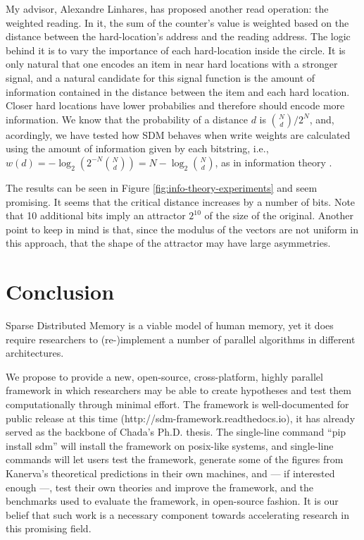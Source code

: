 My advisor, Alexandre Linhares, has proposed another read operation: the weighted reading. In it, the sum of the counter's value is weighted based on the distance between the hard-location's address and the reading address. The logic behind it is to vary the importance of each hard-location inside the circle.  It is only natural that one encodes an item in near hard locations with a stronger signal, and a natural candidate for this signal function is the amount of information contained in the distance between the item and each hard location.  Closer hard locations have lower probabilies and therefore should encode more information. We know that the probability of a distance $d$ is $\binom{N}{d}/2^N$, and, acordingly, we have tested how SDM behaves when write weights are calculated using the amount of information given by each bitstring, i.e., $w(d) = -\log_2 \left( 2^{-N} \binom{N}{d} \right) = N - \log_2 \binom{N}{d}$, as in information theory \citep{cover2012elements}.

The results can be seen in Figure \ref{fig:info-theory-experiments} and seem promising. It seems that the critical distance increases by a number of bits.  Note that 10 additional bits imply an attractor $2^{10}$ of the size of the original. Another point to keep in mind is that, since the modulus of the vectors are not uniform in this approach, that the shape of the attractor may have large asymmetries.


\chapter{Conclusion}

Sparse Distributed Memory is a viable model of human memory, yet it does require researchers to (re-)implement a number of parallel algorithms in different architectures.

We propose to provide a new, open-source, cross-platform, highly parallel framework in which researchers may be able to create hypotheses and test them computationally through minimal effort. The framework is well-documented for public release at this time (http://sdm-framework.readthedocs.io), it has already served as the backbone of Chada's Ph.D. thesis. The single-line command ``pip install sdm'' will install the framework on posix-like systems, and single-line commands will let users test the framework, generate some of the figures from Kanerva's theoretical predictions in their own machines, and --- if interested enough ---, test their own theories and improve the framework, and the benchmarks used to evaluate the framework, in open-source fashion. It is our belief that such work is a necessary component towards accelerating research in this promising field.

